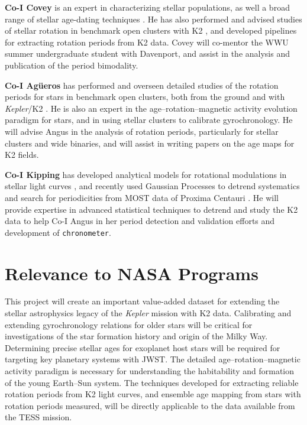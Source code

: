 \documentclass[12pt]{article}
\newcommand{\Kepler}{\textsl{Kepler}\xspace}
\begin{document}
{\bf Co-I Covey} is an expert in characterizing stellar populations, as well a broad range of stellar age-dating techniques \citep{covey2010white}. He has also performed and advised studies of stellar rotation in benchmark open clusters with K2 \citep{douglas2016,covey2016}, and developed pipelines for extracting rotation periods from K2 data. Covey will co-mentor the WWU summer undergraduate student with Davenport, and assist in the analysis and publication of the period bimodality.

{\bf Co-I Ag\"{u}eros} has performed and overseen detailed studies of the rotation periods for stars in benchmark open clusters, both from the ground \citep{agueros2011} and with \Kepler/K2 \citep{douglas2016,douglas2017,nunez2017}. He is also an expert in the age--rotation--magnetic activity evolution paradigm for stars, and in using stellar clusters to calibrate gyrochronology. He will advise Angus in the analysis of rotation periods, particularly for stellar clusters and wide binaries, and will assist in writing papers on the age maps for K2 fields.

{\bf Co-I Kipping}
has developed analytical models for rotational modulations in stellar light curves \citep{kipping2012}, and recently used Gaussian Processes to detrend systematics and search for periodicities from MOST data of Proxima Centauri \citep{kippingmost}. He will provide expertise in advanced statistical techniques to detrend and study the K2 data to help Co-I Angus in her period detection and validation efforts and development of {\tt chronometer}.




\section{Relevance to NASA Programs}
This project will create an important value-added dataset for extending the stellar astrophysics legacy of the \Kepler mission with K2 data.
Calibrating and extending gyrochronology relations for older stars will be critical for  investigations of the star formation history and origin of the Milky Way. Determining precise stellar ages for exoplanet host stars will be required for targeting key planetary systems with JWST. The detailed age--rotation--magnetic activity paradigm is necessary for understanding the habitability and formation of the young Earth--Sun system. The techniques developed for extracting reliable rotation periods from K2 light curves, and ensemble age mapping from stars with rotation periods measured, will be directly applicable to the data available from the TESS mission.
\end{document}
